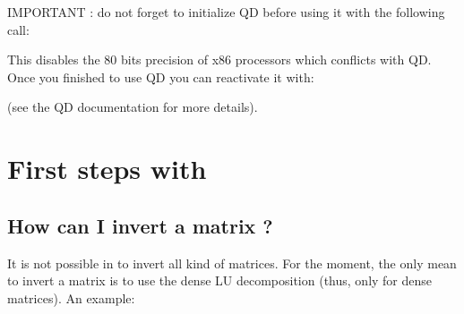 \documentclass[a4paper,11pt,english]{sphinxmanual}
\begin{document}
\sphinxAtStartPar
IMPORTANT : do not forget to initialize QD before using it with the following call:

\begin{sphinxVerbatim}[commandchars=\\\{\}]
  
\end{sphinxVerbatim}

\sphinxAtStartPar
This disables the 80 bits precision of x86 processors which conflicts with QD. Once you finished to use QD you can reactivate it with:

\begin{sphinxVerbatim}[commandchars=\\\{\}]
\end{sphinxVerbatim}

\sphinxAtStartPar
(see the QD documentation for more details).


\chapter{First steps with }
\label{\detokenize{gmm/first-step:first-steps-with-gmm}}\label{\detokenize{gmm/first-step:gmm-first-step}}\label{\detokenize{gmm/first-step::doc}}

\section{How can I invert a matrix ?}
\label{\detokenize{gmm/first-step:how-can-i-invert-a-matrix}}
\sphinxAtStartPar
It is not possible in  to invert all kind of matrices. For the moment, the only mean to invert a matrix is to use the dense LU decomposition (thus, only for dense matrices). An example:
\end{document}
